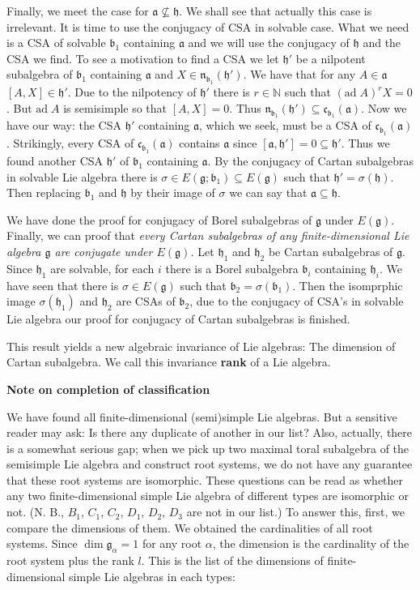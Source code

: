 \documentclass{article}
\newcommand{\NaN}{\mathbb{N}}
\newcommand{\lie}[1]{\mathfrak{#1}}
\newcommand{\ad}[1]{\mathrm{ad}\; #1}
\begin{document}
Finally, we meet the case for $\lie{a} \not\subseteq \lie{h}$.
We shall see that actually this case is irrelevant.
It is time to use the conjugacy of CSA in solvable case.
What we need is a CSA of solvable $\lie{b}_1$ containing $\lie{a}$ and we will use the conjugacy of $\lie{h}$ and the CSA we find.
To see a motivation to find a CSA we let $\lie{h}'$ be a nilpotent subalgebra of $\lie{b}_1$ containing $\lie{a}$ and $X \in \lie{n}_{\lie{b}_1}(\lie{h}')$.
We have that for any $A \in \lie{a}$ $[A, X] \in \lie{h}'$.
Due to the nilpotency of $\lie{h}'$ there is $r \in \NaN$ such that $(\ad{A})^r X = 0$.
But $\ad{A}$ is semisimple so that $[A, X] = 0$.
Thus $\lie{n}_{\lie{b}_1}(\lie{h}') \subseteq \lie{c}_{\lie{b}_1}(\lie{a})$.
Now we have our way: the CSA $\lie{h}'$ containing $\lie{a}$, which we seek, must be a CSA of $\lie{c}_{\lie{b}_1}(\lie{a})$.
Strikingly, every CSA of $\lie{c}_{\lie{b}_1}(\lie{a})$ contains $\lie{a}$ since $[\lie{a}, \lie{h}'] = 0 \subseteq \lie{h}'$.
Thus we found another CSA $\lie{h}'$ of $\lie{b}_1$ containing $\lie{a}$.
By the conjugacy of Cartan subalgebras in solvable Lie algebra there is $\sigma \in E(\lie{g}; \lie{b}_1) \subseteq E(\lie{g})$ such that $\lie{h}' = \sigma(\lie{h})$.
Then replacing $\lie{b}_1$ and $\lie{h}$ by their image of $\sigma$ we can say that $\lie{a} \subseteq \lie{h}$.

We have done the proof for conjugacy of Borel subalgebras of $\lie{g}$ under $E(\lie{g})$.
Finally, we can proof that \textit{every Cartan subalgebras of any finite-dimensional Lie algebra $\lie{g}$ are conjugate under $E(\lie{g})$.}
Let $\lie{h}_1$ and $\lie{h}_2$ be Cartan subalgebras of $\lie{g}$.
Since $\lie{h}_1$ are solvable, for each $i$ there is a Borel subalgebra $\lie{b}_i$ containing $\lie{h}_i$.
We have seen that there is $\sigma \in E(\lie{g})$ such that $\lie{b}_2 = \sigma(\lie{b}_1)$.
Then the isomprphic image $\sigma(\lie{h}_1)$ and $\lie{h}_2$ are CSAs of $\lie{b}_2$, due to the conjugacy of CSA's in solvable Lie algebra our proof for conjugacy of Cartan subalgebras is finished.

This result yields a new algebraic invariance of Lie algebras: The dimension of Cartan subalgebra.
We call this invariance \textbf{rank} of a Lie algebra.

\newpage

\textbf{Note on completion of classification}

We have found all finite-dimensional (semi)simple Lie algebras.
But a sensitive reader may ask: Is there any duplicate of another in our list?
Also, actually, there is a somewhat serious gap; when we pick up two maximal toral subalgebra of the semisimple Lie algebra and construct root systems, we do not have any guarantee that these root systems are isomorphic.
These questions can be read as whether any two finite-dimensional simple Lie algebra of different types are isomorphic or not.
(N. B., $B_1$, $C_1$, $C_2$, $D_1$, $D_2$, $D_3$ are not in our list.)
To answer this, first, we compare the dimensions of them.
We obtained the cardinalities of all root systems.
Since $\dim{\lie{g}_\alpha} = 1$ for any root $\alpha$, the dimension is the cardinality of the root system plus the rank $l$.
This is the list of the dimensions of finite-dimensional simple Lie algebras in each types:
\end{document}
